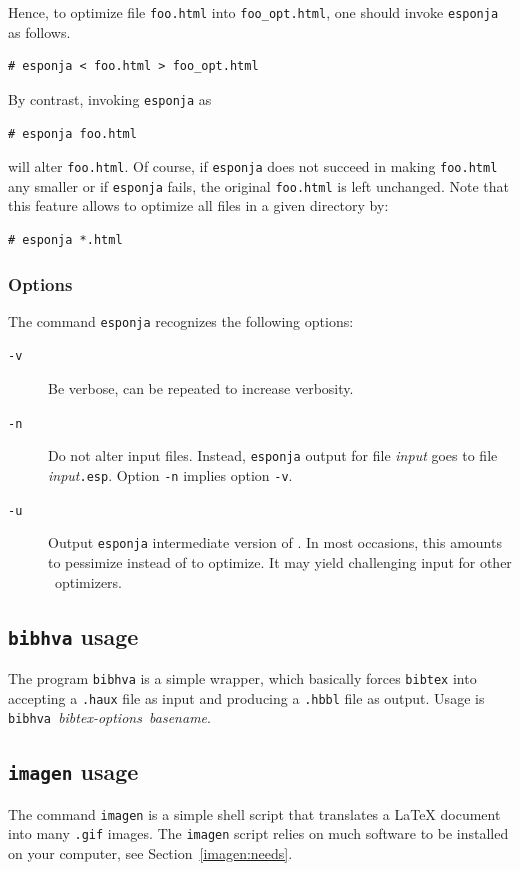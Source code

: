 Hence, to optimize file \texttt{foo.html} into \texttt{foo\_opt.html},
one should invoke \texttt{esponja} as follows.
\begin{verbatim}
# esponja < foo.html > foo_opt.html
\end{verbatim}
By contrast, invoking \texttt{esponja} as
\begin{verbatim}
# esponja foo.html
\end{verbatim}
will alter \texttt{foo.html}.
Of course, if \texttt{esponja} does not succeed in making \texttt{foo.html} any
smaller or if \texttt{esponja} fails, the original \texttt{foo.html}
is left unchanged.
Note that this feature allows to optimize all \html{} files in a given directory
by:
\begin{verbatim}
# esponja *.html
\end{verbatim}



\subsubsection{Options}\label{esponjaoptions}
The command \texttt{esponja} recognizes the following options:
\begin{description}
\item[{\tt -v}]Be verbose, can be repeated to increase verbosity.
\item[{\tt -n}]Do not alter input files. Instead, \texttt{esponja}
output for file \textit{input} goes to file
\textit{input}\texttt{.esp}. Option \texttt{-n}
implies option \texttt{-v}.
\item[{\tt -u}]Output \texttt{esponja} intermediate version of \html.
In most occasions, this amounts to pessimize instead of to optimize.
It may yield challenging input for other \html~optimizers.
\end{description}

\subsection{\texttt{bibhva}\label{bibhva} usage}
The program \texttt{bibhva}
is a simple wrapper, which basically
forces \texttt{bibtex} into accepting a \texttt{.haux} file as input
and producing a \texttt{.hbbl} file as output.
Usage is
\texttt{bibhva }\textit{bibtex-options}\texttt{ }\textit{basename}.


\subsection{\texttt{imagen} usage}\label{imagenusage}
The command \texttt{imagen} is a simple shell script that translates
a \LaTeX{} document into many \texttt{.gif} images.
The \texttt{imagen} script relies on much software to be installed on
your computer, see Section~\ref{imagen:needs}.

